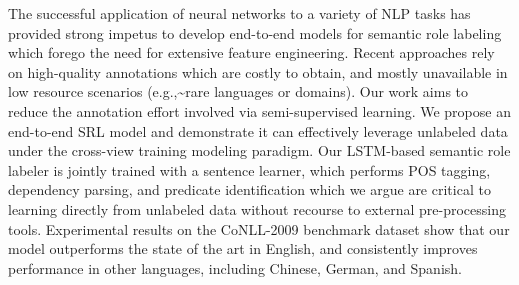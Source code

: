 The successful application of neural networks to a variety of NLP tasks has provided strong impetus to develop end-to-end models for semantic role labeling which forego the need for extensive feature engineering. Recent approaches rely on high-quality annotations which are costly to obtain, and mostly unavailable in low resource scenarios (e.g.,{\textasciitilde}rare languages or domains). Our work aims to reduce the annotation effort involved via semi-supervised learning. We propose an end-to-end SRL model and demonstrate it can effectively leverage unlabeled data under the cross-view training modeling paradigm.  Our LSTM-based semantic role labeler is jointly trained with a sentence learner, which performs POS tagging, dependency parsing, and predicate identification which we argue are critical to learning directly from unlabeled data without recourse to external pre-processing tools.  Experimental results on the CoNLL-2009 benchmark dataset show that our model outperforms the state of the art in English, and consistently improves performance in other languages, including Chinese, German, and Spanish.